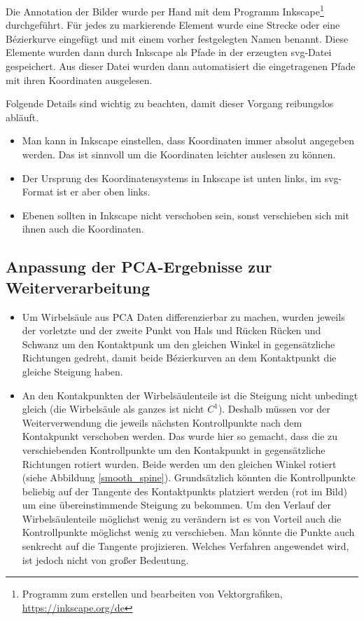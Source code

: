 Die Annotation der Bilder wurde per Hand mit dem Programm Inkscape\footnote{Programm zum erstellen und bearbeiten von Vektorgrafiken, \url{https://inkscape.org/de}} durchgeführt. Für jedes zu markierende Element wurde eine Strecke oder eine Bézierkurve eingefügt und mit einem vorher festgelegten Namen benannt. Diese Elemente wurden dann durch Inkscape als Pfade in der erzeugten svg-Datei gespeichert. Aus dieser Datei wurden dann automatisiert die eingetragenen Pfade mit ihren Koordinaten ausgelesen.

Folgende Details sind wichtig zu beachten, damit dieser Vorgang reibungslos abläuft. 
\begin{itemize}
 \item Man kann in Inkscape einstellen, dass Koordinaten immer absolut angegeben werden. Das ist sinnvoll um die Koordinaten leichter auslesen zu können.
 \item Der Ursprung des Koordinatensystems in Inkscape ist unten links, im svg-Format ist er aber oben links.
 \item Ebenen sollten in Inkscape nicht verschoben sein, sonst verschieben sich mit ihnen auch die Koordinaten.  
\end{itemize}

\subsection{Anpassung der PCA-Ergebnisse zur Weiterverarbeitung}

\begin{itemize}
 \item Um Wirbelsäule aus PCA Daten differenzierbar zu machen, wurden jeweils der vorletzte und der zweite Punkt von Hals und Rücken \bzw Rücken und Schwanz um den Kontaktpunk um den gleichen Winkel in gegensätzliche Richtungen gedreht, damit beide Bézierkurven an dem Kontaktpunkt die gleiche Steigung haben. 
 \item An den Kontakpunkten der Wirbelsäulenteile ist die Steigung nicht unbedingt gleich (die Wirbelsäule als ganzes ist nicht $C^1$). Deshalb müssen vor der Weiterverwendung die jeweils nächsten Kontrollpunkte nach dem Kontakpunkt verschoben werden. Das wurde hier so gemacht, dass die zu verschiebenden Kontrollpunkte um den Kontakpunkt in gegensätzliche Richtungen rotiert wurden. Beide werden um den gleichen Winkel rotiert (siehe Abbildung \ref{smooth_spine}). Grundsätzlich könnten die Kontrollpunkte beliebig auf der Tangente des Kontaktpunkts platziert werden (rot im Bild) um eine übereinstimmende Steigung zu bekommen. Um den Verlauf der Wirbelsäulenteile möglichst wenig zu verändern ist es von Vorteil auch die Kontrollpunkte möglichst wenig zu verschieben. Man könnte die Punkte \zb auch senkrecht auf die Tangente projizieren. Welches Verfahren angewendet wird, ist jedoch nicht von großer Bedeutung. 
\end{itemize}

